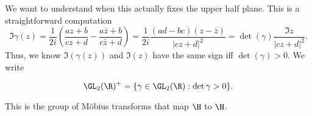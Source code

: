 \documentclass[a4paper]{article}
\begin{document}
We want to understand when this actually fixes the upper half plane. This is a straightforward computation
\[
  \Im \gamma(z) = \frac{1}{2i} \left(\frac{az + b}{cz + d} - \frac{a\bar{z} + b}{c \bar{z} + d}\right) = \frac{1}{2i} \frac{(ad - bc) (z - \bar{z})}{|cz + d|^2} = \det(\gamma) \frac{\Im z}{ |cz + d|^2}.
\]
%
Thus, we know $\Im(\gamma(z))$ and $\Im(z)$ have the same sign iff $\det(\gamma) > 0$. We write
\begin{defi}[$\GL_2(\R)^+$]
  \[
    \GL_2(\R)^+ = \{\gamma \in \GL_2(\R) : \det \gamma > 0\}.
  \]
\end{defi}
This is the group of M\"obius transforms that map $\H$ to $\H$.
\end{document}
